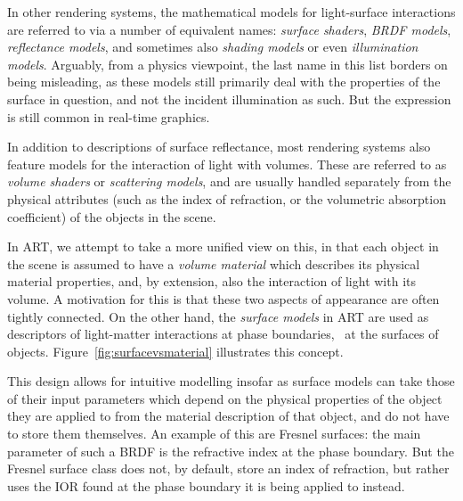 In other rendering systems, the mathematical models for light-surface interactions are referred to via a number of equivalent names: \emph{surface shaders}, \emph{BRDF models}, \emph{reflectance models}, and sometimes also \emph{shading models} or even \emph{illumination models}. Arguably, from a physics viewpoint, the last name in this list borders on being misleading, as these models still primarily deal with the properties of the surface in question, and not the incident illumination as such. But the expression is still common in real-time graphics.

In addition to descriptions of surface reflectance, most rendering systems also feature models for the interaction of light with volumes. These are referred to as \emph{volume shaders} or \emph{scattering models}, and are usually handled separately from the physical attributes (such as the index of refraction, or the volumetric absorption coefficient) of the objects in the scene.

In ART, we attempt to take a more unified view on this, in that each object in the scene is assumed to have a \emph{volume material} which describes its physical material properties, and, by extension, also the interaction of light with its volume. A motivation for this is that these two aspects of appearance are often tightly connected. On the other hand, the \emph{surface models} in ART are used as descriptors of light-matter interactions at phase boundaries, \ie~at the surfaces of objects. Figure~\ref{fig:surfacevsmaterial} illustrates this concept. 

This design allows for intuitive modelling insofar as surface models can take those of their input parameters which depend on the physical properties of the object they are applied to from the material description of that object, and do not have to store them themselves. An example of this are Fresnel surfaces: the main parameter of such a BRDF is the refractive index at the phase boundary. But the Fresnel surface class does not, by default, store an index of refraction, but rather uses the IOR found at the phase boundary it is being applied to instead. 

